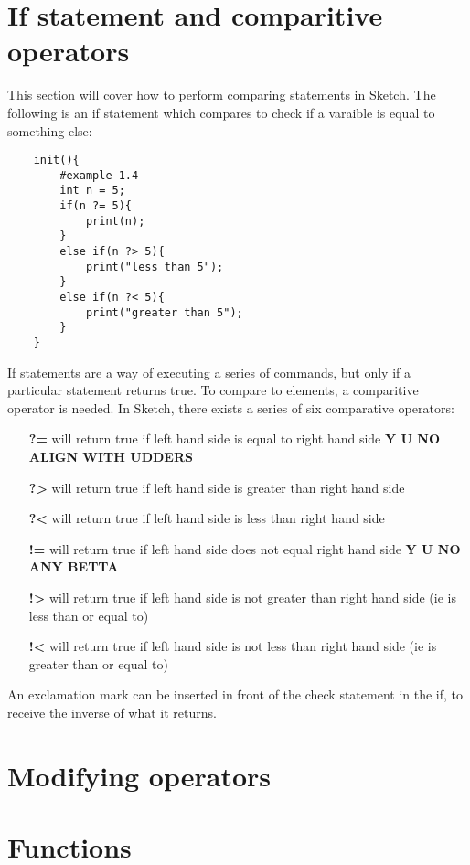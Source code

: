 \documentclass{l3proj}
\begin{document}
\section{If statement and comparitive operators}
\label{comp}
This section will cover how to perform comparing statements in Sketch. The following is an if statement which compares to check if a varaible is equal to something else:
\begin{verbatim}
    init(){
        #example 1.4
        int n = 5;
        if(n ?= 5){
            print(n);
        }
        else if(n ?> 5){
            print("less than 5");
        }
        else if(n ?< 5){
            print("greater than 5");
        }
    }
\end{verbatim}
If statements are a way of executing a series of commands, but only if a particular statement returns true. To compare to elements, a comparitive operator is needed. In Sketch, there exists a series of six comparative operators:
\begin{itemize}
\item[\textbf{?=}] will return true if left hand side is equal to right hand side \textbf{Y U NO ALIGN WITH UDDERS}
\item[\textbf{?\textgreater}] will return true if left hand side is greater than right hand side
\item[\textbf{?\textless}] will return true if left hand side is less than right hand side
\item[\textbf{!=}] will return true if left hand side does not equal right hand side \textbf{Y U NO ANY BETTA}
\item[\textbf{!\textgreater}] will return true if left hand side is not greater than right hand side (ie is less than or equal to)
\item[\textbf{!\textless}] will return true if left hand side is not less than right hand side (ie is greater than or equal to)
\end{itemize}
An exclamation mark can be inserted in front of the check statement in the if, to receive the inverse of what it returns.

\section{Modifying operators}

\section{Functions}
\end{document}
